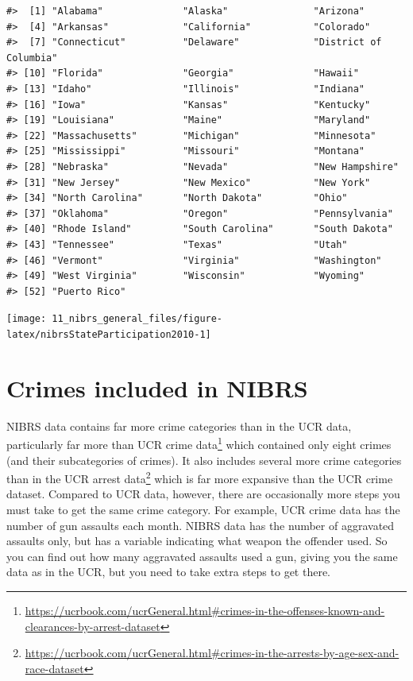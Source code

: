 \documentclass[
]{krantz}
\let\origfigure\figure
\let\endorigfigure\endfigure
\renewenvironment{figure}[1][2] {
    \expandafter\origfigure\expandafter[H]
} {
    \endorigfigure
}
\renewcommand{\href}[2]{#2\footnote{\url{#1}}}
\begin{document}
\begin{verbatim}
#>  [1] "Alabama"              "Alaska"               "Arizona"             
#>  [4] "Arkansas"             "California"           "Colorado"            
#>  [7] "Connecticut"          "Delaware"             "District of Columbia"
#> [10] "Florida"              "Georgia"              "Hawaii"              
#> [13] "Idaho"                "Illinois"             "Indiana"             
#> [16] "Iowa"                 "Kansas"               "Kentucky"            
#> [19] "Louisiana"            "Maine"                "Maryland"            
#> [22] "Massachusetts"        "Michigan"             "Minnesota"           
#> [25] "Mississippi"          "Missouri"             "Montana"             
#> [28] "Nebraska"             "Nevada"               "New Hampshire"       
#> [31] "New Jersey"           "New Mexico"           "New York"            
#> [34] "North Carolina"       "North Dakota"         "Ohio"                
#> [37] "Oklahoma"             "Oregon"               "Pennsylvania"        
#> [40] "Rhode Island"         "South Carolina"       "South Dakota"        
#> [43] "Tennessee"            "Texas"                "Utah"                
#> [46] "Vermont"              "Virginia"             "Washington"          
#> [49] "West Virginia"        "Wisconsin"            "Wyoming"             
#> [52] "Puerto Rico"
\end{verbatim}

\begin{figure}

{\centering \texttt{[image: 11\_nibrs\_general\_files/figure-latex/nibrsStateParticipation2010-1]} 

}

\caption{The percent of each state's population that is covered by police agencies reporting at least one month of data to NIBRS, 2010.}\label{fig:nibrsStateParticipation2010}
\end{figure}

\section{Crimes included in
NIBRS}\label{crimes-included-in-nibrs}

NIBRS data contains far more crime categories than in the
UCR data, particularly far more than
\href{https://ucrbook.com/ucrGeneral.html\#crimes-in-the-offenses-known-and-clearances-by-arrest-dataset}{UCR
crime data} which contained only eight crimes (and their
subcategories of crimes). It also includes several more
crime categories than in the
\href{https://ucrbook.com/ucrGeneral.html\#crimes-in-the-arrests-by-age-sex-and-race-dataset}{UCR
arrest data} which is far more expansive than the UCR crime
dataset. Compared to UCR data, however, there are
occasionally more steps you must take to get the same crime
category. For example, UCR crime data has the number of gun
assaults each month. NIBRS data has the number of aggravated
assaults only, but has a variable indicating what weapon the
offender used. So you can find out how many aggravated
assaults used a gun, giving you the same data as in the UCR,
but you need to take extra steps to get there.
\end{document}
